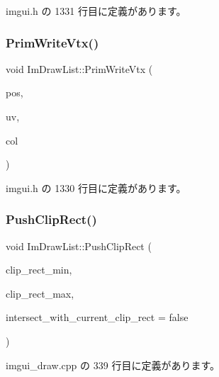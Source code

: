  imgui.\+h の 1331 行目に定義があります。

\mbox{\label{struct_im_draw_list_af86de4faf6c8e978fb712ea14c5d0c5f}} 
\subsubsection{\texorpdfstring{Prim\+Write\+Vtx()}{PrimWriteVtx()}}
{\footnotesize\ttfamily void Im\+Draw\+List\+::\+Prim\+Write\+Vtx (\begin{DoxyParamCaption}\item[{const \mbox{\hyperlink{struct_im_vec2}{Im\+Vec2}} \&}]{pos,  }\item[{const \mbox{\hyperlink{struct_im_vec2}{Im\+Vec2}} \&}]{uv,  }\item[{\mbox{\hyperlink{imgui_8h_a118cff4eeb8d00e7d07ce3d6460eed36}{Im\+U32}}}]{col }\end{DoxyParamCaption})\hspace{0.3cm}{\ttfamily [inline]}}



 imgui.\+h の 1330 行目に定義があります。

\mbox{\label{struct_im_draw_list_acb34e2d3708616cae4567f3b4af06962}} 
\subsubsection{\texorpdfstring{Push\+Clip\+Rect()}{PushClipRect()}}
{\footnotesize\ttfamily void Im\+Draw\+List\+::\+Push\+Clip\+Rect (\begin{DoxyParamCaption}\item[{\mbox{\hyperlink{struct_im_vec2}{Im\+Vec2}}}]{clip\+\_\+rect\+\_\+min,  }\item[{\mbox{\hyperlink{struct_im_vec2}{Im\+Vec2}}}]{clip\+\_\+rect\+\_\+max,  }\item[{bool}]{intersect\+\_\+with\+\_\+current\+\_\+clip\+\_\+rect = {\ttfamily false} }\end{DoxyParamCaption})}



 imgui\+\_\+draw.\+cpp の 339 行目に定義があります。

